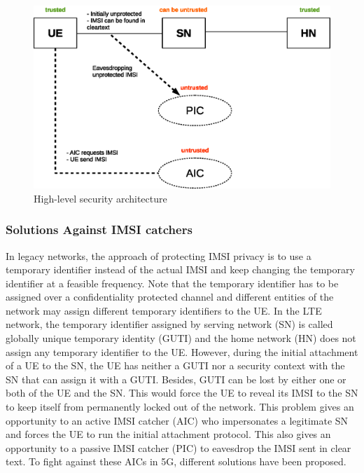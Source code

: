 \documentclass[conference]{IEEEtran}
\begin{document}
\begin{figure}
\begin{center}
  \includegraphics[width=.45\textwidth]{security_architecture_abstraction.eps}
\caption{High-level security architecture}
\label{fig:security_architecture_abstraction}       %
\end{center}
\end{figure}


\subsubsection{Solutions Against IMSI catchers}
In legacy networks, the approach of protecting IMSI privacy is to use a temporary identifier instead of the actual IMSI and keep changing the temporary identifier at a feasible frequency. Note that the temporary identifier has to be assigned over a confidentiality protected channel and different entities of the network may assign different temporary identifiers to the UE. In the LTE network, the temporary identifier assigned by serving network (SN) is called globally unique temporary identity (GUTI) and the home network (HN) does not assign any temporary identifier to the UE. However, during the initial attachment of a UE to the SN, the UE has neither a GUTI nor a security context with the SN that can assign it with a GUTI. Besides, GUTI can be lost by either one or both of the UE and the SN. This would force the UE to reveal its IMSI to the SN to keep itself from permanently locked out of the network. This problem gives an opportunity to an active IMSI catcher (AIC) who impersonates a legitimate SN and forces the UE to run the initial attachment protocol. This also gives an opportunity to a passive IMSI catcher (PIC) to eavesdrop the IMSI sent in clear text. To fight against these AICs in 5G, different solutions \cite{pseudonym_valtteri_philip, pseudonym_ericsson, ICTJournal} have been proposed.
\end{document}
